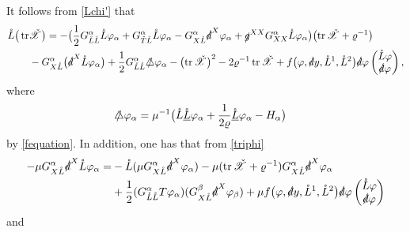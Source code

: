 \documentclass[11pt,twoside]{article}
\def\al{\alpha}
\def\vp{\varphi}
\def\f{\frac}
\begin{document}
It follows from \eqref{Lchi'} that
 \begin{equation}\label{Ltrchi}
\begin{split}
\mathring{L}\big(\operatorname{tr}&\check{\mathscr X}\big)
= -\big(\frac{1}{2}G_{\mathring{L}\mathring{L}}^\al\mathring{L}\varphi_\al
+ G_{\tilde{T}\mathring{L}}^\al\mathring{L}\varphi_\al
- G_{X\mathring{L}}^\al\slashed{d}^X\varphi_\al
+ \slashed{g}^{XX}G_{XX}^\al\mathring{L}\vp_\al\big)
\bigl(\operatorname{tr}\check{\mathscr X} + \varrho^{-1}\bigr) \\
&-G_{X\mathring{L}}^\al\bigl(\slashed{d}^X\mathring{L}\varphi_\al\bigr)
+ \frac{1}{2}G_{\mathring{L}\mathring{L}}^\al\slashed{\triangle}\varphi_\al
- \bigl(\operatorname{tr}\check{\mathscr X}\bigr)^2-2\varrho^{-1}\operatorname{tr}\check{\mathscr X}+f\bigl(\varphi, \slashed{d}y, \mathring{L}^1, \mathring{L}^2\bigr)\slashed{d}\vp
\begin{pmatrix} \mathring{L}\varphi \\ \slashed{d}\varphi \end{pmatrix},
\end{split}
\end{equation}
where
\begin{equation}\label{triphi}
\begin{split}
&\slashed\triangle\varphi_\al=\mu^{-1}\big(\mathring L\mathring{\underline L}\varphi_\al+\f{1}{2\varrho}\mathring {\underline L}\varphi_\al-{H}_\al\big)
\end{split}
\end{equation}
by \eqref{fequation}. In addition, one has that from \eqref{triphi}
\begin{equation*}
\begin{split}
-\mu G_{X\mathring L}^\al\slashed d^X\mathring L\varphi_\al=&-\mathring L(\mu G_{X\mathring L}^\al\slashed d^X\varphi_\al)-\mu(\operatorname{tr}\check{\mathscr X}+\varrho^{-1})G_{X\mathring L}^\al\slashed d^X\varphi_\al\\
&+\f12(G_{\mathring L\mathring L}^\al T\vp_\al)(G_{X\mathring L}^\beta\slashed d^X\vp_\beta)+\mu f\bigl(\varphi, \slashed{d}y, \mathring{L}^1, \mathring{L}^2\bigr)\slashed{d}\vp
\begin{pmatrix} \mathring{L}\varphi \\ \slashed{d}\varphi \end{pmatrix}
\end{split}
\end{equation*}
and
\end{document}
